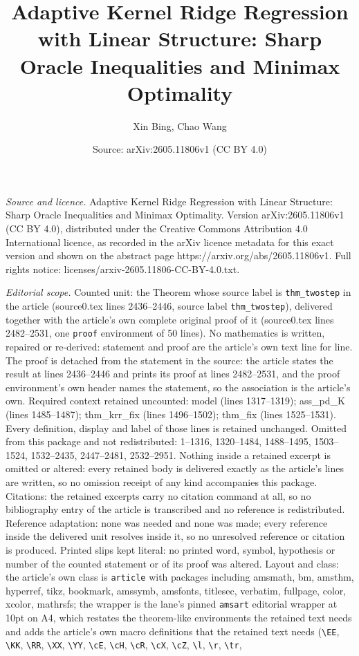 \documentclass[10pt,a4paper]{amsart}
\title[Adaptive Kernel Ridge Regression with Linear Structure: Shar]{Adaptive Kernel Ridge Regression with Linear Structure: Sharp Oracle Inequalities and Minimax Optimality}
\author{Xin Bing, Chao Wang}
\date{Source: arXiv:2605.11806v1 (CC BY 4.0)}
\begin{document}
\maketitle

\noindent\emph{Source and licence.} Adaptive Kernel Ridge Regression with Linear Structure: Sharp Oracle Inequalities and Minimax Optimality. Version arXiv:2605.11806v1 (CC BY 4.0), distributed under the Creative Commons Attribution 4.0 International licence, as recorded in the arXiv licence metadata for this exact version and shown on the abstract page https://arxiv.org/abs/2605.11806v1. Full rights notice: licenses/arxiv-2605.11806-CC-BY-4.0.txt.\par\smallskip

\noindent\textit{Editorial scope.} Counted unit: the Theorem whose source label is \texttt{thm\_twostep} in the article (source0.tex lines 2436--2446, source label \texttt{thm\_twostep}), delivered together with the article's own complete original proof of it (source0.tex lines 2482--2531, one \texttt{proof} environment of 50 lines). No mathematics is written, repaired or re-derived: statement and proof are the article's own text line for line. The proof is detached from the statement in the source: the article states the result at lines 2436--2446 and prints its proof at lines 2482--2531, and the proof environment's own header names the statement, so the association is the article's own. Required context retained uncounted: model (lines 1317--1319); ass\_pd\_K (lines 1485--1487); thm\_krr\_fix (lines 1496--1502); thm\_fix (lines 1525--1531). Every definition, display and label of those lines is retained unchanged. Omitted from this package and not redistributed: 1--1316, 1320--1484, 1488--1495, 1503--1524, 1532--2435, 2447--2481, 2532--2951. Nothing inside a retained excerpt is omitted or altered: every retained body is delivered exactly as the article's lines are written, so no omission receipt of any kind accompanies this package. Citations: the retained excerpts carry no citation command at all, so no bibliography entry of the article is transcribed and no reference is redistributed. Reference adaptation: none was needed and none was made; every reference inside the delivered unit resolves inside it, so no unresolved reference or citation is produced. Printed slips kept literal: no printed word, symbol, hypothesis or number of the counted statement or of its proof was altered. Layout and class: the article's own class is \texttt{article} with packages including amsmath, bm, amsthm, hyperref, tikz, bookmark, amssymb, amsfonts, titlesec, verbatim, fullpage, color, xcolor, mathrsfs; the wrapper is the lane's pinned \texttt{amsart} editorial wrapper at 10pt on A4, which restates the theorem-like environments the retained text needs and adds the article's own macro definitions that the retained text needs (\texttt{\textbackslash EE}, \texttt{\textbackslash KK}, \texttt{\textbackslash RR}, \texttt{\textbackslash XX}, \texttt{\textbackslash YY}, \texttt{\textbackslash cE}, \texttt{\textbackslash cH}, \texttt{\textbackslash cR}, \texttt{\textbackslash cX}, \texttt{\textbackslash cZ}, \texttt{\textbackslash l}, \texttt{\textbackslash r}, \texttt{\textbackslash tr}, 
\end{document}
